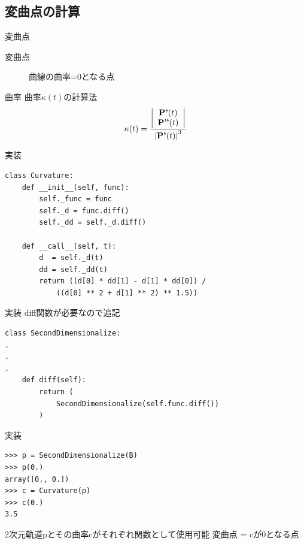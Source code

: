 \documentclass[12pt, xetex, xcolor=pdftex, dvipsnames]{beamer}
\renewcommand{\vec}{\textbf} %
\begin{document}
\subsection{変曲点の計算}
\begin{frame}{変曲点}
    \begin{description}
        \item[変曲点] 曲線の曲率=0となる点
    \end{description}
\end{frame}
\begin{frame}{曲率}
    曲率$\kappa(t)$の計算法
    \begin{align}
        \kappa(t) =
        \dfrac{%
            \left|\begin{array}{c}
                \vec{P'}(t)\\
                \vec{P''}(t)
            \end{array}\right|
        }{%
            \left|\vec{P'}(t)\right|^3%
        }
    \end{align}
\end{frame}
\begin{frame}[fragile]{実装}
\begin{lstlisting}
class Curvature:
    def __init__(self, func):
        self._func = func
        self._d = func.diff()
        self._dd = self._d.diff()

    def __call__(self, t):
        d  = self._d(t)
        dd = self._dd(t)
        return ((d[0] * dd[1] - d[1] * dd[0]) /
            ((d[0] ** 2 + d[1] ** 2) ** 1.5))
\end{lstlisting}
\end{frame}
\begin{frame}[fragile]{実装}
    diff関数が必要なので追記
\begin{lstlisting}
class SecondDimensionalize:
.
.
.
    def diff(self):
        return (
            SecondDimensionalize(self.func.diff())
        )
\end{lstlisting}
\end{frame}
\begin{frame}[fragile]{実装}
\begin{lstlisting}
>>> p = SecondDimensionalize(B)
>>> p(0.)
array([0., 0.])
>>> c = Curvature(p)
>>> c(0.)
3.5
\end{lstlisting}
2次元軌道pとその曲率cがそれぞれ関数として使用可能
\pause
変曲点 = cが0となる点
\end{frame}
\end{document}
